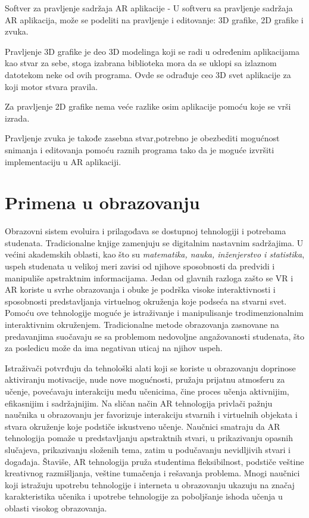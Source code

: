 \documentclass[a4paper]{article}
\begin{document}
	Softver za pravljenje sadržaja AR aplikacije - U softveru sa pravljenje sadržaja AR aplikacija, može se podeliti na pravljenje i editovanje: 3D grafike, 2D 
	grafike i zvuka.

	Pravljenje 3D grafike je deo 3D modelinga koji se radi u određenim aplikacijama kao stvar za sebe, stoga izabrana biblioteka mora da se uklopi sa izlaznom 
	datotekom neke od ovih programa. Ovde se odrađuje ceo 3D svet aplikacije za koji motor stvara pravila.

	Za pravljenje 2D grafike nema veće razlike osim aplikacije pomoću koje se vrši izrada.

	Pravljenje zvuka je takođe zasebna stvar,potrebno je obezbediti mogućnost snimanja i editovanja pomoću raznih programa tako da je moguće izvršiti 
	implementaciju  u AR aplikaciji. \cite{Istorija 1}

	\section{Primena u obrazovanju}
	\label{sec:Primena u obrazovanju}
	Obrazovni sistem evoluira i prilagođava se dostupnoj tehnologiji i potrebama studenata. Tradicionalne knjige zamenjuju se digitalnim nastavnim sadržajima. 
	U većini akademskih oblasti, kao što su \emph{matematika, nauka, inženjerstvo i statistika}, uspeh studenata u velikoj meri zavisi od njihove sposobnosti da 
	predvidi i manipuliše apstraktnim informacijama. Jedan od glavnih razloga zašto se VR i AR koriste u svrhe obrazovanja i obuke je podrška visoke interaktivnosti 
	i sposobnosti predstavljanja virtuelnog okruženja koje podseća na stvarni svet. Pomoću ove tehnologije moguće je istraživanje i manipulisanje trodimenzionalnim 
	interaktivnim okruženjem. Tradicionalne metode obrazovanja zasnovane na predavanjima suočavaju se sa problemom nedovoljne  angažovanosti studenata, što za posledicu 
	može da ima negativan uticaj na njihov uspeh.


	Istraživači potvrđuju da tehnološki alati koji se koriste u obrazovanju doprinose aktiviranju motivacije, nude nove mogućnosti, pružaju prijatnu atmosferu za učenje, 
	povećavaju interakciju među učenicima, čine proces učenja aktivnijim, efikasnijim i sadržajnijim. Na sličan način AR tehnologija privlači pažnju naučnika u obrazovanju 
	jer favorizuje interakciju stvarnih i virtuelnih objekata i stvara okruženje koje podstiče iskustveno učenje. Naučnici smatraju da AR tehnologija pomaže u predstavljanju 
	apstraktnih stvari, u prikazivanju opasnih slučajeva, prikazivanju složenih tema, zatim u podučavanju nevidljivih stvari i događaja. Štaviše, AR tehnologija pruža studentima 
	fleksibilnost, podstiče veštine kreativnog razmišljanja, veštine tumačenja i rešavanja problema. Mnogi naučnici koji istražuju upotrebu tehnologije i interneta u obrazovanju 
	ukazuju na značaj karakteristika učenika i upotrebe tehnologije za poboljšanje ishoda učenja u oblasti visokog obrazovanja. \cite{Primena AR tehnologije obrazovanju 1}
\end{document}
